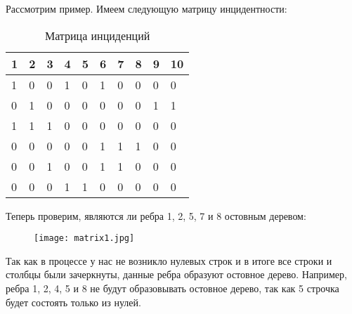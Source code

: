 Рассмотрим пример. Имеем следующую матрицу инцидентности:
\begin{table}[h]
    \centering
    \begin{tabular}[c]{ | l | l | l | l | l | l | l | l | l | l | }
        \hline
        1 & 2 & 3 & 4 & 5 & 6 & 7 & 8 & 9 & 10 \\ \hline
        1 & 0 & 0 & 1 & 0 & 1 & 0 & 0 & 0 & 0 \\ \hline
        0 & 1 & 0 & 0 & 0 & 0 & 0 & 0 & 1 & 1 \\ \hline
        1 & 1 & 1 & 0 & 0 & 0 & 0 & 0 & 0 & 0 \\ \hline
        0 & 0 & 0 & 0 & 0 & 1 & 1 & 1 & 0 & 0 \\ \hline
        0 & 0 & 1 & 0 & 0 & 1 & 1 & 0 & 0 & 0 \\ \hline
        0 & 0 & 0 & 1 & 1 & 0 & 0 & 0 & 0 & 0 \\ 
        \hline
    \end{tabular}
    \caption{Матрица инциденций}
\end{table}

Теперь проверим, являются ли ребра 1, 2, 5, 7 и 8 остовным деревом:
\begin{figure}[!h]
    \centering 
    \texttt{[image: matrix1.jpg]}
\end{figure}

Так как в процессе у нас не возникло нулевых строк и в итоге все строки и столбцы 
были зачеркнуты, данные ребра образуют остовное дерево.
Например, ребра 1, 2, 4, 5 и 8 не будут образовывать остовное дерево, так как 5
строчка будет состоять только из нулей.